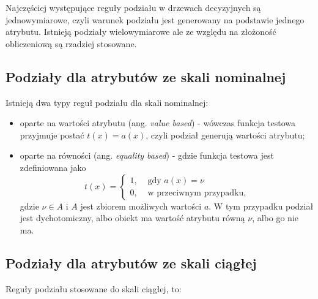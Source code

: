 \documentclass[]{book}
\providecommand{\tightlist}{%
  \setlength{\itemsep}{0pt}\setlength{\parskip}{0pt}}
\theoremstyle{plain}
\theoremstyle{definition}
\begin{document}
Najczęściej występujące reguły podziału w drzewach decyzyjnych są jednowymiarowe, czyli warunek podziału jest generowany na podstawie jednego atrybutu. Istnieją podziały wielowymiarowe ale ze względu na złożoność obliczeniową są rzadziej stosowane.

\hypertarget{podziay-dla-atrybutow-ze-skali-nominalnej}{%
\subsection{Podziały dla atrybutów ze skali nominalnej}\label{podziay-dla-atrybutow-ze-skali-nominalnej}}

Istnieją dwa typy reguł podziału dla skali nominalnej:

\begin{itemize}
\tightlist
\item
  oparte na wartości atrybutu (ang. \emph{value based}) - wówczas funkcja testowa przyjmuje postać \(t(x)=a(x)\), czyli podział generują wartości atrybutu;
\item
  oparte na równości (ang. \emph{equality based}) - gdzie funkcja testowa jest zdefiniowana jako
  \begin{equation}
    t(x)= \begin{cases}
        1, &\text{ gdy } a(x)=\nu\\
        0, & \text{ w przeciwnym przypadku},
    \end{cases}
  \end{equation}
  gdzie \(\nu\in A\) i \(A\) jest zbiorem możliwych wartości \(a\). W tym przypadku podział jest dychotomiczny, albo obiekt ma wartość atrybutu równą \(\nu\), albo go nie ma.
\end{itemize}

\hypertarget{podziay-dla-atrybutow-ze-skali-ciagej}{%
\subsection{Podziały dla atrybutów ze skali ciągłej}\label{podziay-dla-atrybutow-ze-skali-ciagej}}

Reguły podziału stosowane do skali ciągłej, to:
\end{document}
